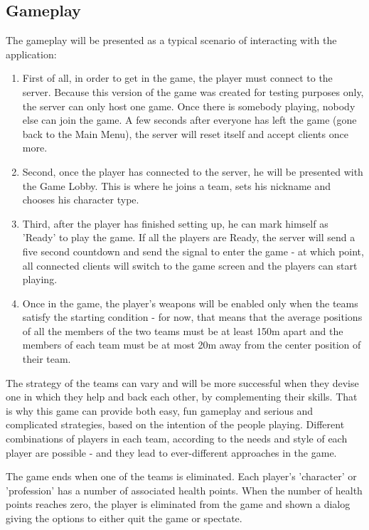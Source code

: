 \subsection{Gameplay}

The gameplay will be presented as a typical scenario of interacting with the
application:

\begin{enumerate}
  \item First of all, in order to get in the game, the player must connect to
  the server. Because this version of the game was created for testing purposes
  only, the server can only host one game. Once there is somebody playing,
  nobody else can join the game. A few seconds after everyone has left the game
  (gone back to the Main Menu), the server will reset itself and accept clients
  once more.
  
  \item Second, once the player has connected to the server, he will be
  presented with the Game Lobby. This is where he joins a team, sets his
  nickname and chooses his character type.

  \item Third, after the player has finished setting up, he can mark himself as
  'Ready' to play the game. If all the players are Ready, the server will send a
  five second countdown and send the signal to enter the game - at which point,
  all connected clients will switch to the game screen and the players can
  start playing.
  
  \item Once in the game, the player's weapons will be enabled only when the
  teams satisfy the starting condition - for now, that means that the average
  positions of all the members of the two teams must be at least 150m apart and
  the members of each team must be at most 20m away from the center position of
  their team.
 
\end{enumerate}

The strategy of the teams can vary and will be more successful when they devise
one in which they help and back each other, by complementing their skills. That
is why this game can provide both easy, fun gameplay and serious and complicated
strategies, based on the intention of the people playing. Different combinations
of players in each team, according to the needs and style of each player are
possible - and they lead to ever-different approaches in the game.\newline

The game ends when one of the teams is eliminated. Each player's 'character' or
'profession' has a number of associated health points. When the number of health
points reaches zero, the player is eliminated from the game and shown a dialog
giving the options to either quit the game or spectate.\newline

